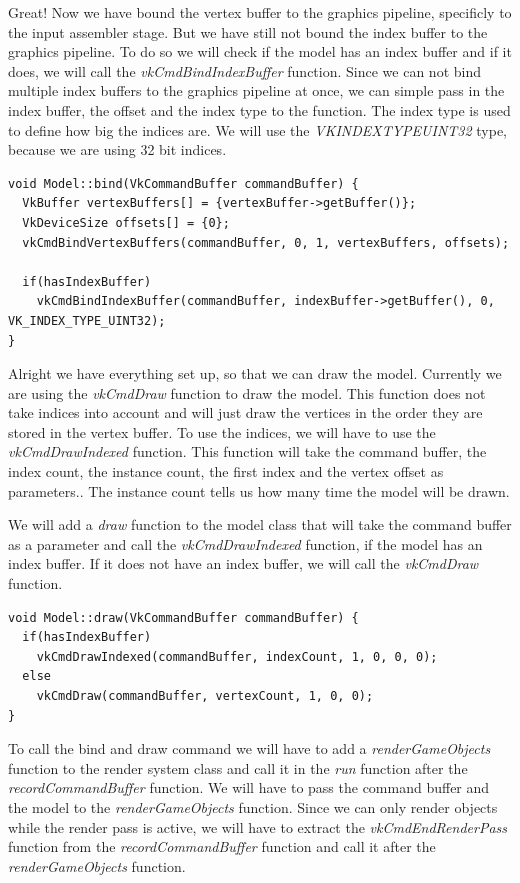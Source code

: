 \documentclass[12pt]{report} \usepackage{preamble}
\begin{document}
Great! Now we have bound the vertex buffer to the graphics pipeline, specificly to the input assembler stage.
But we have still not bound the index buffer to the graphics pipeline. To do so we will check if the model has an index buffer and if it does, we will call the \textit{vkCmdBindIndexBuffer}
function. Since we can not bind multiple index buffers to the graphics pipeline at once, we can simple pass in the index buffer, the offset and the index type to the function.
The index type is used to define how big the indices are. We will use the \textit{VK\textunderscore INDEX\textunderscore TYPE\textunderscore UINT32} type, because we are using 32 bit indices.

\begin{lstlisting}[Language=C++]
void Model::bind(VkCommandBuffer commandBuffer) {
  VkBuffer vertexBuffers[] = {vertexBuffer->getBuffer()};
  VkDeviceSize offsets[] = {0};
  vkCmdBindVertexBuffers(commandBuffer, 0, 1, vertexBuffers, offsets);

  if(hasIndexBuffer)
    vkCmdBindIndexBuffer(commandBuffer, indexBuffer->getBuffer(), 0, VK_INDEX_TYPE_UINT32);
}
\end{lstlisting}

Alright we have everything set up, so that we can draw the model. Currently we are using the \textit{vkCmdDraw} function to draw the model.
This function does not take indices into account and will just draw the vertices in the order they are stored in the vertex buffer.
To use the indices, we will have to use the \textit{vkCmdDrawIndexed} function. This function will take
the command buffer, the index count, the instance count, the first index and the vertex offset as parameters..
The instance count tells us how many time the model will be drawn.

We will add a \textit{draw} function to the model class that will take the command buffer as a parameter and call the \textit{vkCmdDrawIndexed} function,
if the model has an index buffer. If it does not have an index buffer, we will call the \textit{vkCmdDraw} function.

\begin{lstlisting}[Language=C++]
void Model::draw(VkCommandBuffer commandBuffer) {
  if(hasIndexBuffer)
    vkCmdDrawIndexed(commandBuffer, indexCount, 1, 0, 0, 0);
  else
    vkCmdDraw(commandBuffer, vertexCount, 1, 0, 0);
}
\end{lstlisting}

To call the bind and draw command we will have to add a \textit{renderGameObjects} function to the render system class and call it in the \textit{run} function
after the \textit{recordCommandBuffer} function. We will have to pass the command buffer and the model to the \textit{renderGameObjects} function. Since we can only render
objects while the render pass is active, we will have to extract the \textit{vkCmdEndRenderPass} function from the \textit{recordCommandBuffer} function and call it after
the \textit{renderGameObjects} function.
\end{document}
